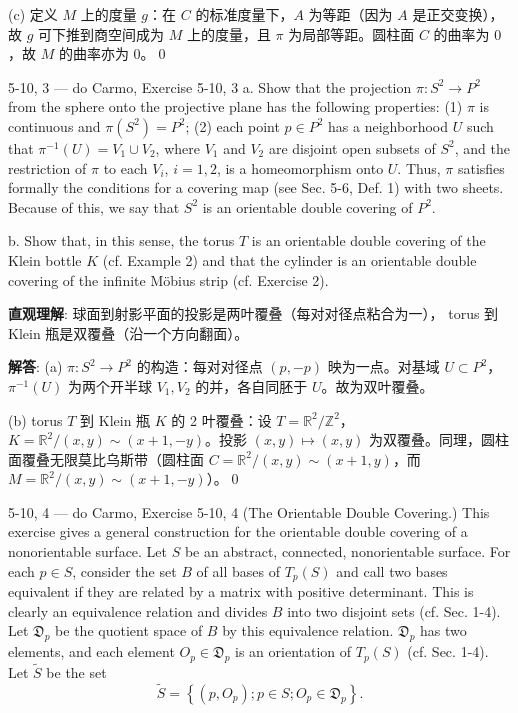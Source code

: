 \begin{Remark}
\begin{solution}
(c) 定义 $M$ 上的度量 $g$：在 $C$ 的标准度量下，$A$ 为等距（因为 $A$ 是正交变换），故 $g$ 可下推到商空间成为 $M$ 上的度量，且 $\pi$ 为局部等距。圆柱面 $C$ 的曲率为 $0$，故 $M$ 的曲率亦为 $0$。\qed
\end{solution}

\begin{exercise}{5-10, 3 — do Carmo, Exercise 5-10, 3}
a. Show that the projection $\pi \colon S^2 \to P^2$ from the sphere onto the projective plane has the following properties: (1) $\pi$ is continuous and $\pi(S^2) = P^2$; (2) each point $p \in P^2$ has a neighborhood $U$ such that $\pi^{-1}(U) = V_1 \cup V_2$, where $V_1$ and $V_2$ are disjoint open subsets of $S^2$, and the restriction of $\pi$ to each $V_i$, $i = 1, 2$, is a homeomorphism onto $U$. Thus, $\pi$ satisfies formally the conditions for a covering map (see Sec. 5-6, Def. 1) with two sheets. Because of this, we say that $S^2$ is an orientable double covering of $P^2$.

b. Show that, in this sense, the torus $T$ is an orientable double covering of the Klein bottle $K$ (cf. Example 2) and that the cylinder is an orientable double covering of the infinite Möbius strip (cf. Exercise 2).
\end{exercise}
\begin{solution}
\textbf{直观理解}: 球面到射影平面的投影是两叶覆叠（每对对径点粘合为一）， torus 到 Klein 瓶是双覆叠（沿一个方向翻面）。

\textbf{解答}: (a) $\pi: S^2\to P^2$ 的构造：每对对径点 $(p,-p)$ 映为一点。对基域 $U\subset P^2$，$\pi^{-1}(U)$ 为两个开半球 $V_1,V_2$ 的并，各自同胚于 $U$。故为双叶覆叠。

(b) torus $T$ 到 Klein 瓶 $K$ 的 2 叶覆叠：设 $T=\mathbb{R}^2/\mathbb{Z}^2$，$K=\mathbb{R}^2/(x,y)\sim(x+1,-y)$。投影 $(x,y)\mapsto(x,y)$ 为双覆叠。同理，圆柱面覆叠无限莫比乌斯带（圆柱面 $C=\mathbb{R}^2/(x,y)\sim(x+1,y)$，而 $M=\mathbb{R}^2/(x,y)\sim(x+1,-y)$）。\qed
\end{solution}

\begin{exercise}{5-10, 4 — do Carmo, Exercise 5-10, 4}
(The Orientable Double Covering.) This exercise gives a general construction for the orientable double covering of a nonorientable surface. Let $S$ be an abstract, connected, nonorientable surface. For each $p \in S$, consider the set $B$ of all bases of $T_p(S)$ and call two bases equivalent if they are related by a matrix with positive determinant. This is clearly an equivalence relation and divides $B$ into two disjoint sets (cf. Sec. 1-4). Let $\mathfrak{D}_p$ be the quotient space of $B$ by this equivalence relation. $\mathfrak{D}_p$ has two elements, and each element $O_p \in \mathfrak{D}_p$ is an orientation of $T_p(S)$ (cf. Sec. 1-4). Let $\tilde{S}$ be the set
\[
\tilde {S} = \left\{\left(p, O _ {p}\right); p \in S; O _ {p} \in \mathfrak {D} _ {p} \right\}.
\]


\end{exercise}
\end{Remark}
